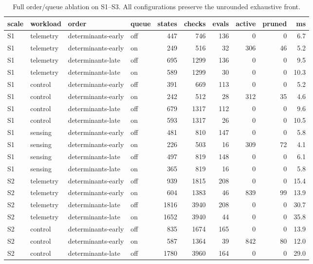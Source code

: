 \documentclass[preprint,11pt,3p]{elsarticle}
\begin{document}
\begin{table}[!htbp]\centering
\caption{Full order/queue ablation on S1--S3. All configurations preserve the unrounded exhaustive front.}
\scriptsize
\begin{tabular}{llllrrrrrr}
\toprule
scale & workload & order & queue & states & checks & evals & active & pruned & ms \\
\midrule
S1 & telemetry & determinants-early & off & 447 & 746 & 136 & 0 & 0 & 6.7 \\
S1 & telemetry & determinants-early & on & 249 & 516 & 32 & 306 & 46 & 5.2 \\
S1 & telemetry & determinants-late & off & 695 & 1299 & 136 & 0 & 0 & 9.5 \\
S1 & telemetry & determinants-late & on & 589 & 1299 & 30 & 0 & 0 & 10.3 \\
S1 & control & determinants-early & off & 391 & 669 & 113 & 0 & 0 & 5.2 \\
S1 & control & determinants-early & on & 242 & 512 & 28 & 312 & 35 & 4.6 \\
S1 & control & determinants-late & off & 679 & 1317 & 112 & 0 & 0 & 9.6 \\
S1 & control & determinants-late & on & 593 & 1317 & 26 & 0 & 0 & 10.5 \\
S1 & sensing & determinants-early & off & 481 & 810 & 147 & 0 & 0 & 5.8 \\
S1 & sensing & determinants-early & on & 226 & 503 & 16 & 309 & 72 & 4.1 \\
S1 & sensing & determinants-late & off & 497 & 819 & 148 & 0 & 0 & 6.1 \\
S1 & sensing & determinants-late & on & 365 & 819 & 16 & 0 & 0 & 5.8 \\
S2 & telemetry & determinants-early & off & 939 & 1815 & 208 & 0 & 0 & 15.4 \\
S2 & telemetry & determinants-early & on & 604 & 1383 & 46 & 839 & 99 & 13.9 \\
S2 & telemetry & determinants-late & off & 1816 & 3940 & 208 & 0 & 0 & 30.7 \\
S2 & telemetry & determinants-late & on & 1652 & 3940 & 44 & 0 & 0 & 35.8 \\
S2 & control & determinants-early & off & 835 & 1674 & 165 & 0 & 0 & 13.9 \\
S2 & control & determinants-early & on & 587 & 1364 & 39 & 842 & 80 & 12.0 \\
S2 & control & determinants-late & off & 1780 & 3960 & 164 & 0 & 0 & 29.0 \\

\end{tabular}
\end{table}
\end{document}
